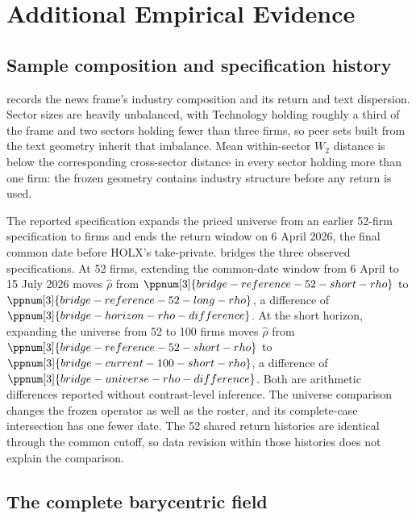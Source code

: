 \section{Additional Empirical Evidence}
\label{sec:app-empirical}

\subsection{Sample composition and specification history}
\label{sec:app-sample}



 records the news frame's industry
composition and its return and text dispersion.
Sector sizes are heavily unbalanced, with Technology holding roughly a third of
the frame and two sectors holding fewer than three firms, so peer sets built
from the text geometry inherit that imbalance.
Mean within-sector $W_2$ distance is below the corresponding cross-sector
distance in every sector holding more than one firm: the frozen geometry
contains industry structure before any return is used.

The reported specification expands the priced universe from an earlier 52-firm
specification to  firms and ends the return window
on 6 April 2026, the final common date before HOLX's take-private.
 bridges the three observed
specifications.
At 52 firms, extending the common-date window from 6 April to 15 July 2026
moves $\hat\rho$ from
$\ppnum[3]{bridge-reference-52-short-rho}$ to
$\ppnum[3]{bridge-reference-52-long-rho}$, a difference of
$\ppnum[3]{bridge-horizon-rho-difference}$.
At the short horizon, expanding the universe from 52 to 100 firms moves
$\hat\rho$ from $\ppnum[3]{bridge-reference-52-short-rho}$ to
$\ppnum[3]{bridge-current-100-short-rho}$, a difference of
$\ppnum[3]{bridge-universe-rho-difference}$.
Both are arithmetic differences reported without contrast-level inference.
The universe comparison changes the frozen operator as well as the roster, and
its complete-case intersection has one fewer date.
The 52 shared return histories are identical through the common cutoff, so
data revision within those histories does not explain the comparison.



\subsection{The complete barycentric field}
\label{sec:app-field-anatomy}

